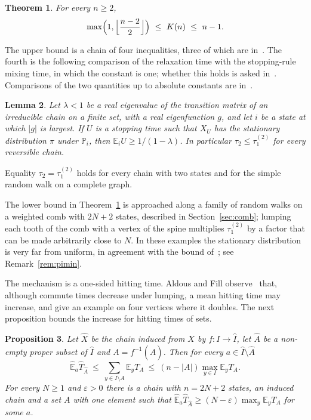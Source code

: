 \documentclass[11pt]{amsart}
\newtheorem{theorem}{Theorem}
\newtheorem{proposition}[theorem]{Proposition}
\newtheorem{lemma}[theorem]{Lemma}
\theoremstyle{definition}
\newcommand{\Prob}{\mathbb{P}}
\newcommand{\E}{\mathbb{E}}
\newcommand{\tmix}{\tau_1^{(2)}}
\newcommand{\hE}{\widehat{\E}}
\newcommand{\hI}{\widehat{I}}
\newcommand{\hA}{\widehat{A}}
\newcommand{\hX}{\widehat{X}}
\begin{document}
\begin{theorem}\label{thm:main}
For every $n\ge2$,
\[
\max\Bigl(1,\Bigl\lfloor\frac{n-2}{2}\Bigr\rfloor\Bigr)\ \le\ K(n)\ \le\ n-1 .
\]
\end{theorem}

The upper bound is a chain of four inequalities, three of which are in~\cite{AF}. The fourth is the following
comparison of the relaxation time with the stopping-rule mixing time, in which the constant is one; whether this holds
is asked in~\cite[Open Problem~4.48(b)]{AF}. Comparisons of the two quantities up to absolute constants are
in~\cite{Aldous82,LW98}.

\begin{lemma}\label{lem:relax}
Let $\lambda<1$ be a real eigenvalue of the transition matrix of an irreducible chain on a finite set, with a real
eigenfunction $g$, and let $i$ be a state at which $|g|$ is largest. If $U$ is a stopping time such that $X_U$ has the
stationary distribution $\pi$ under $\Prob_i$, then $\E_iU\ge 1/(1-\lambda)$. In particular $\tau_2\le\tmix$ for
every reversible chain.
\end{lemma}

Equality $\tau_2=\tmix$ holds for every chain with two states and for the simple random walk on a complete graph.

The lower bound in Theorem~\ref{thm:main} is approached along a family of random walks on a weighted comb with $2N+2$
states, described in Section~\ref{sec:comb}; lumping each tooth of the comb with a vertex of the spine multiplies
$\tmix$ by a factor that can be made arbitrarily close to $N$. In these examples the stationary distribution is very
far from uniform, in agreement with the bound of~\cite{HP}; see Remark~\ref{rem:pimin}.

The mechanism is a one-sided hitting time. Aldous and Fill observe~\cite[Section~4.6.1]{AF} that, although commute
times decrease under lumping, a mean hitting time may increase, and give an example on four vertices where it
doubles. The next proposition bounds the increase for hitting times of sets.

\begin{proposition}\label{prop:hit}
Let $\hX$ be the chain induced from $X$ by $f:I\to\hI$, let $\hA$ be a non-empty proper subset of $\hI$ and
$A=f^{-1}(\hA)$. Then for every $a\in\hI\setminus\hA$
\[
\hE_a\widehat{T}_{\hA}\ \le\ \sum_{y\in I\setminus A}\E_yT_A\ \le\ (n-|A|)\max_{y\in I}\E_yT_A .
\]
For every $N\ge1$ and $\varepsilon>0$ there is a chain with $n=2N+2$ states, an induced chain and a set $A$
with one element such that $\hE_a\widehat{T}_{\hA}\ge(N-\varepsilon)\max_y\E_yT_A$ for some $a$.
\end{proposition}
\end{document}
